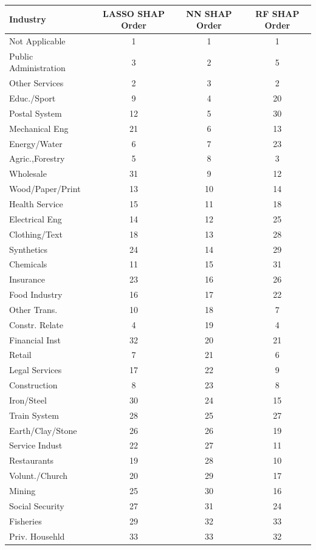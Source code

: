 \begin{tabular}{lccc}
\hline\hline
Industry & LASSO SHAP Order & NN SHAP Order & RF SHAP Order \\
\hline
Not Applicable&1&1&1\\
Public Administration&3&2&5\\
Other Services&2&3&2\\
Educ./Sport&9&4&20\\
Postal System&12&5&30\\
Mechanical Eng&21&6&13\\
Energy/Water&6&7&23\\
Agric.,Forestry&5&8&3\\
Wholesale&31&9&12\\
Wood/Paper/Print&13&10&14\\
Health Service&15&11&18\\
Electrical Eng&14&12&25\\
Clothing/Text&18&13&28\\
Synthetics&24&14&29\\
Chemicals&11&15&31\\
Insurance&23&16&26\\
Food Industry&16&17&22\\
Other Trans.&10&18&7\\
Constr. Relate&4&19&4\\
Financial Inst&32&20&21\\
Retail&7&21&6\\
Legal Services&17&22&9\\
Construction&8&23&8\\
Iron/Steel&30&24&15\\
Train System&28&25&27\\
Earth/Clay/Stone&26&26&19\\
Service Indust&22&27&11\\
Restaurants&19&28&10\\
Volunt./Church&20&29&17\\
Mining&25&30&16\\
Social Security&27&31&24\\
Fisheries&29&32&33\\
Priv. Househld&33&33&32\\
\hline\hline
\end{tabular}
